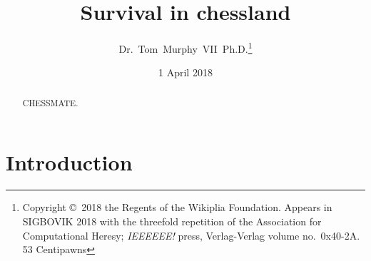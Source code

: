 \documentclass[twocolumn]{article}
\begin{document}
 

\title{Survival in chessland}
\author{Dr.~Tom~Murphy~VII~Ph.D.\footnote{
Copyright \copyright\ 2018 the Regents of the Wikiplia
Foundation. Appears in SIGBOVIK 2018 with the threefold
repetition of the Association for Computational Heresy; 
{\em IEEEEEE!} press, Verlag-Verlag volume no.~0x40-2A.
53 Centipawns} }


\newcommand\checkmate{\hspace{-.05em}\raisebox{.4ex}{\tiny\bf ++}}

\renewcommand\th{\ensuremath{{}^{\textrm{th}}}}
\newcommand\st{\ensuremath{{}^{\textrm{st}}}}
\newcommand\rd{\ensuremath{{}^{\textrm{rd}}}}
\newcommand\nd{\ensuremath{{}^{\textrm{nd}}}}
\newcommand\at{\ensuremath{\scriptstyle @}}

\date{1 April 2018}

\maketitle \thispagestyle{empty}

\begin{abstract}
CHESSMATE.
\end{abstract}

\section*{Introduction}
\end{document}
